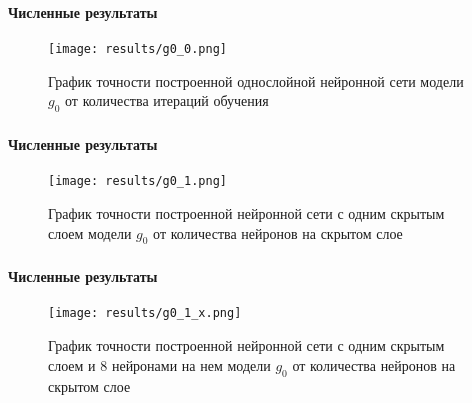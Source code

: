 \documentclass[notheorems]{beamer}
\theoremstyle{plain}
\theoremstyle{definition}
\theoremstyle{remark}
\begin{document}
\begin{frame}
  \frametitle{\secname}
  \framesubtitle{Численные результаты}
  
  \begin{figure}[H]
  	\texttt{[image: results/g0\_0.png]}
  	
  	\caption{График точности построенной однослойной нейронной сети модели $g_0$ от количества итераций обучения}
  	
  \end{figure}

\end{frame}


\begin{frame}
	\frametitle{\secname}
	\framesubtitle{Численные результаты}

	\begin{figure}[H]
		\texttt{[image: results/g0\_1.png]}
		
		\caption{График точности построенной нейронной сети с одним скрытым слоем модели $g_0$ от количества нейронов на скрытом слое}
	\end{figure}

\end{frame}


\begin{frame}
	\frametitle{\secname}
	\framesubtitle{Численные результаты}
	
	
	\begin{figure}[H]
		\texttt{[image: results/g0\_1\_x.png]}
		
		\caption{График точности построенной нейронной сети с одним скрытым слоем и 8 нейронами на нем модели $g_0$ от количества нейронов на скрытом слое}
	\end{figure}
	
\end{frame}
\end{document}
